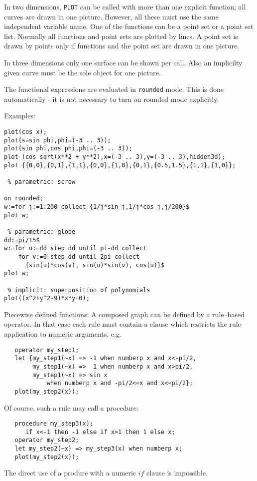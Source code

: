 In two dimensions,  \verb+PLOT+ can be called with
more than one explicit function; all curves 
are drawn in one picture. However,
all these must use the same independent variable name.
One of the functions can be a point set or a point set list.
Normally all functions and point sets are plotted by
lines. A point set is drawn by points only if functions and 
the point set are drawn in one picture.

In three dimensions only one surface can be shown per call.
Also an implicilty given curve  must be the sole object for one
picture.

The functional expressions are evaluated in \verb$rounded$ mode.
This is done automatically - it is not necessary to turn
on rounded mode explicitly. 

\newpage

Examples:
\begin{verbatim}
plot(cos x);
plot(s=sin phi,phi=(-3 .. 3));
plot(sin phi,cos phi,phi=(-3 .. 3));
plot (cos sqrt(x**2 + y**2),x=(-3 .. 3),y=(-3 .. 3),hidden3d);
plot {{0,0},{0,1},{1,1},{0,0},{1,0},{0,1},{0.5,1.5},{1,1},{1,0}};

 % parametric: screw

on rounded;
w:=for j:=1:200 collect {1/j*sin j,1/j*cos j,j/200}$
plot w;

 % parametric: globe
dd:=pi/15$
w:=for u:=dd step dd until pi-dd collect
    for v:=0 step dd until 2pi collect
      {sin(u)*cos(v), sin(u)*sin(v), cos(u)}$
plot w;

 % implicit: superposition of polynomials
plot((x^2+y^2-9)*x*y=0);
\end{verbatim}
 
Piecewise defined functions: 
A composed graph can be defined by a rule--based operator.
In that case each rule must contain a clause which restricts
the rule application to numeric arguments, e.g.
\begin{verbatim}
   operator my_step1;
   let {my_step1(~x) => -1 when numberp x and x<-pi/2, 
        my_step1(~x) =>  1 when numberp x and x>pi/2,
        my_step1(~x) => sin x
            when numberp x and -pi/2<=x and x<=pi/2};
   plot(my_step2(x));
\end{verbatim}
Of course, such a rule may call a procedure:
\begin{verbatim}
   procedure my_step3(x);
      if x<-1 then -1 else if x>1 then 1 else x;
   operator my_step2;
   let my_step2(~x) => my_step3(x) when numberp x; 
   plot(my_step2(x));
\end{verbatim}
The direct use of a produre with a numeric $if$ clause
is impossible. 

